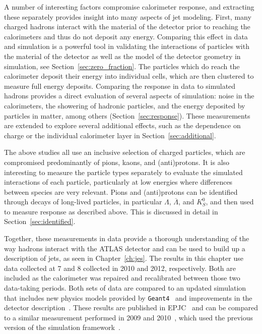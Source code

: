 A number of interesting factors compromise calorimeter response, and extracting these separately provides insight into many aspects of jet modeling.
First, many charged hadrons interact with the material of the detector prior to reaching the calorimeters and thus do not deposit any energy.
Comparing this effect in data and simulation is a powerful tool in validating the interactions of particles with the material of the detector as well as the model of the detector geometry in simulation, see Section~\ref{sec:zero_fraction}.
The particles which do reach the calorimeter deposit their energy into individual cells, which are then clustered to measure full energy deposits.
Comparing the response in data to simulated hadrons provides a direct evaluation of several aspects of simulation: noise in the calorimeters, the showering of hadronic particles, and the energy deposited by particles in matter, among others (Section~\ref{sec:response}). 
These measurements are extended to explore several additional effects, such as the dependence on charge or the individual calorimeter layer in Section~\ref{sec:additional}. 

The above studies all use an inclusive selection of charged particles, which are compromised predominantly of pions, kaons, and (anti)protons.
It is also interesting to measure the particle types separately to evaluate the simulated interactions of each particle, particularly at low energies where differences between species are very relevant.
Pions and (anti)protons can be identified through decays of long-lived particles, in particular $\Lambda$, $\overline{\Lambda}$, and $K_{S}^{0}$, and then used to measure response as described above.
This is discussed in detail in Section~\ref{sec:identified}.

Together, these measurements in data provide a thorough understanding of the way hadrons interact with the ATLAS detector and can be used to build up a description of jets, as seen in Chapter~\ref{ch:jes}.
The results in this chapter use data collected at 7 and 8 \TeV collected in 2010 and 2012, respectively.
Both are included as the calorimeter was repaired and recalibrated between those two data-taking periods.
Both sets of data are compared to an updated simulation that includes new physics models provided by \texttt{Geant4}~\cite{GEANT4} and improvements in the detector description~\cite{PERF-2011-08,PERF-2013-05}.
These results are published in EPJC~\cite{PERF-2015-05} and can be compared to a similar measurement performed in 2009 and 2010~\cite{PERF-2011-05}, which used the previous version of the simulation framework~\cite{SOFT-2010-01}.

